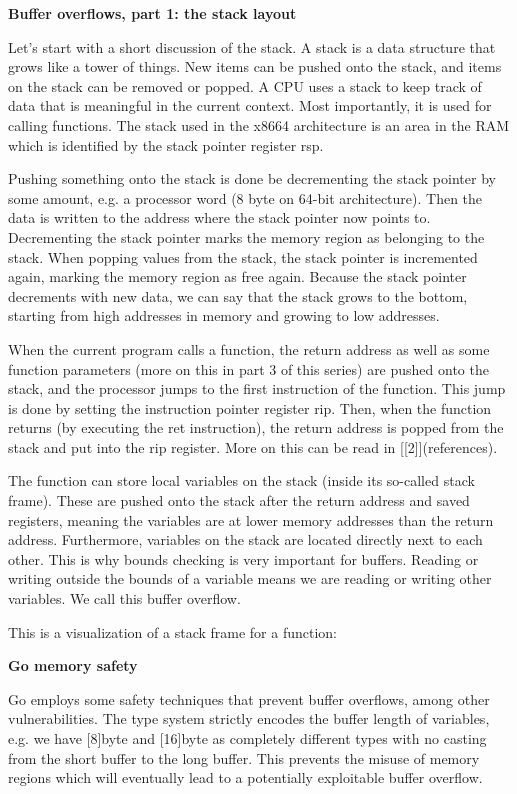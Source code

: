 \textbf{Buffer overflows, part 1: the stack layout }

Let's start with a short discussion of the stack. A stack is a data structure that grows like a tower of things. New 
items can be pushed onto the stack, and items on the stack can be removed or popped. A CPU uses a stack to keep track 
of data that is meaningful in the current context. Most importantly, it is used for calling functions. The stack used 
in the x8664 architecture is an area in the RAM which is identified by the stack pointer register rsp.

Pushing something onto the stack is done be decrementing the stack pointer by some amount, e.g. a processor word (8 byte
on 64-bit architecture). Then the data is written to the address where the stack pointer now points to. Decrementing the
stack pointer marks the memory region as belonging to the stack. When popping values from the stack, the stack pointer
is incremented again, marking the memory region as free again. Because the stack pointer decrements with new data, we
can say that the stack grows to the bottom, starting from high addresses in memory and growing to low addresses.


When the current program calls a function, the return address as well as some function parameters (more on this in part
3 of this series) are pushed onto the stack, and the processor jumps to the first instruction of the function. This jump is done
by setting the instruction pointer register rip. Then, when the function returns (by executing the ret instruction),
the return address is popped from the stack and put into the rip register. More on this can be read in [[2]](references).

The function can store local variables on the stack (inside its so-called stack frame). These are pushed onto the stack
after the return address and saved registers, meaning the variables are at lower memory addresses than the return 
address. Furthermore, variables on the stack are located directly next to each other. This is why bounds checking is 
very important for buffers. Reading or writing outside the bounds of a variable means we are reading or writing other 
variables. We call this buffer overflow.

This is a visualization of a stack frame for a function:


\textbf{Go memory safety}

Go employs some safety techniques that prevent buffer overflows, among other vulnerabilities. The type system strictly
encodes the buffer length of variables, e.g. we have [8]byte and [16]byte as completely different types with no
casting from the short buffer to the long buffer. This prevents the misuse of memory regions which will eventually lead
to a potentially exploitable buffer overflow.

